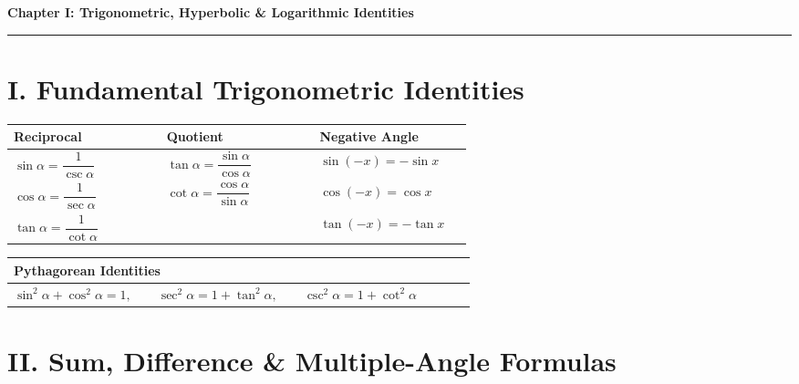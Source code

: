 \documentclass[11pt, a4paper]{article}
\begin{document}
\newpage

\begin{center}
    {\LARGE \bfseries \color{accent} Chapter I: Trigonometric, Hyperbolic \& Logarithmic Identities}\\
    \vspace{0.2cm}
    {\color{accent}\rule{0.55\linewidth}{0.8pt}}
\end{center}
\vspace{0.35cm}

\section*{I. Fundamental Trigonometric Identities}

\begin{center}
\begin{tabular}{@{}p{0.3\linewidth} p{0.3\linewidth} p{0.3\linewidth}@{}}
\toprule
\textbf{Reciprocal} & \textbf{Quotient} & \textbf{Negative Angle} \\
\midrule
$\sin\alpha = \dfrac{1}{\csc\alpha}$ & $\tan\alpha = \dfrac{\sin\alpha}{\cos\alpha}$ & $\sin(-x) = -\sin x$ \\[2mm]
$\cos\alpha = \dfrac{1}{\sec\alpha}$ & $\cot\alpha = \dfrac{\cos\alpha}{\sin\alpha}$ & $\cos(-x) = \cos x$ \\[2mm]
$\tan\alpha = \dfrac{1}{\cot\alpha}$ & & $\tan(-x) = -\tan x$ \\
\bottomrule
\end{tabular}
\end{center}

\begin{center}
\begin{tabular}{@{}p{0.9\linewidth}@{}}
\toprule
\textbf{Pythagorean Identities} \\
\midrule
$\sin^2\alpha + \cos^2\alpha = 1, \qquad \sec^2\alpha = 1 + \tan^2\alpha, \qquad \csc^2\alpha = 1 + \cot^2\alpha$ \\
\bottomrule
\end{tabular}
\end{center}

\section*{II. Sum, Difference \& Multiple-Angle Formulas}
\end{document}

